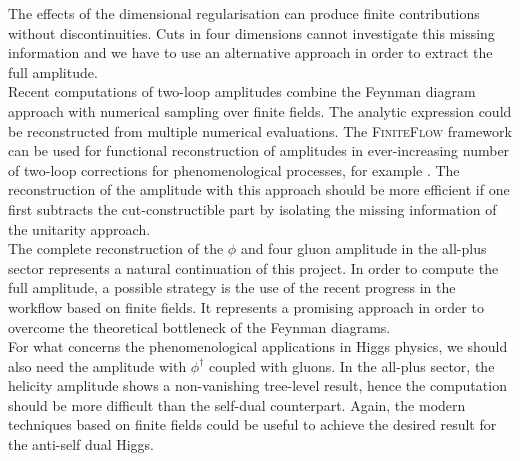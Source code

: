 The effects of the dimensional regularisation can produce finite contributions without discontinuities. Cuts in four dimensions cannot investigate this missing information and we have to use an alternative approach in order to extract the full amplitude.\\
Recent computations of two-loop amplitudes combine the Feynman diagram approach with numerical sampling over finite fields. The analytic expression could be reconstructed from multiple numerical evaluations. The \textsc{FiniteFlow} framework \cite{Peraro_2019} can be used for functional reconstruction of amplitudes \cite{Peraro_2016} in ever-increasing number of two-loop corrections for phenomenological processes, for example \cite{Badger:2021ega, Badger:2021nhg}. The reconstruction of the amplitude with this approach should be more efficient if one first subtracts the cut-constructible part by isolating the missing information of the unitarity approach.\\
The complete reconstruction of the $\phi$ and four gluon amplitude in the all-plus sector represents a natural continuation of this project. In order to compute the full amplitude, a possible strategy is the use of the recent progress in the workflow based on finite fields. It represents a promising approach in order to overcome the theoretical bottleneck of the Feynman diagrams.\\
For what concerns the phenomenological applications in Higgs physics, we should also need the amplitude with $\phi^\dagger$ coupled with gluons. In the all-plus sector, the helicity amplitude shows a non-vanishing tree-level result, hence the computation should be more difficult than the self-dual counterpart. Again, the modern techniques based on finite fields could be useful to achieve the desired result for the anti-self dual Higgs.